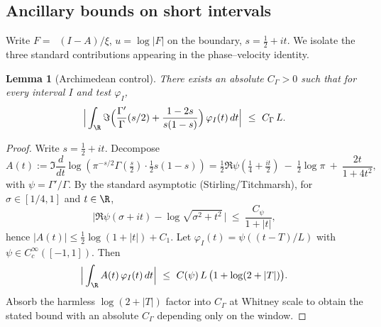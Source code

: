 \documentclass[11pt]{article}
\newtheorem{lemma}[theorem]{Lemma}
\theoremstyle{remark}
\DeclareMathOperator{\dettwo}{det_2}
\begin{document}
\subsection{Ancillary bounds on short intervals}
Write \(F=\dettwo(I-A)/\xi\), \(u=\log|F|\) on the boundary, \(s=\tfrac12+it\). We isolate the three standard contributions appearing in the phase--velocity identity.
\begin{lemma}[Archimedean control]\label{lem:arch}
There exists an absolute \(C_\Gamma>0\) such that for every interval \(I\) and test \(\varphi_I\),
\[ \Big|\int_{\R} \Im\Big(\frac{\Gamma'}{\Gamma}(s/2)+\frac{1-2s}{s(1-s)}\Big)\,\varphi_I(t)\,dt\Big|\ \le\ C_\Gamma\,L.\]
\end{lemma}
\begin{proof}
Write \(s=\tfrac12+it\). Decompose
\[
 A(t):=\Im\frac{d}{dt}\log\!\left(\pi^{-s/2}\Gamma\!\left(\tfrac{s}{2}\right)\cdot\tfrac12 s(1-s)\right)
 = \tfrac12\Re\psi\!\left(\tfrac14+\tfrac{it}{2}\right)\ -\ \tfrac12\log\pi\ +\ \frac{2t}{1+4t^2},
\]
with \(\psi=\Gamma'/\Gamma\). By the standard asymptotic (Stirling/Titchmarsh), for \(\sigma\in[1/4,1]\) and \(t\in\R\),
\[
 \Big|\Re\psi(\sigma+it)-\log\sqrt{\sigma^2+t^2}\,\Big|\ \le\ \frac{C_\psi}{1+|t|},
\]
hence \(|A(t)|\le \tfrac12\log(1+|t|)+C_1\). Let \(\varphi_I(t)=\psi((t-T)/L)\) with \(\psi\in C_c^\infty([-1,1])\). Then
\[
 \Big|\int_{\R} A(t)\,\varphi_I(t)\,dt\Big|\ \le\ C(\psi)\,L\,\big(1+\log(2+|T|)\big).
\]
Absorb the harmless \(\log(2+|T|)\) factor into \(C_\Gamma\) at Whitney scale to obtain the stated bound with an absolute \(C_\Gamma\) depending only on the window.\qedhere
\end{proof}
\end{document}
